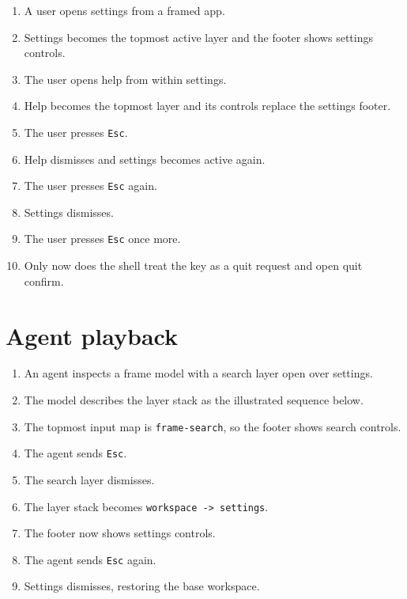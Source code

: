 \begin{enumerate}
\def\labelenumi{\arabic{enumi}.}
\tightlist
\item
  A user opens settings from a framed app.
\item
  Settings becomes the topmost active layer and the footer shows settings controls.
\item
  The user opens help from within settings.
\item
  Help becomes the topmost layer and its controls replace the settings footer.
\item
  The user presses \texttt{E\allowbreak{}s\allowbreak{}c}.
\item
  Help dismisses and settings becomes active again.
\item
  The user presses \texttt{E\allowbreak{}s\allowbreak{}c} again.
\item
  Settings dismisses.
\item
  The user presses \texttt{E\allowbreak{}s\allowbreak{}c} once more.
\item
  Only now does the shell treat the key as a quit request and open quit confirm.
\end{enumerate}

\section{Agent playback}\label{record-255-agent-playback}

\begin{enumerate}
\def\labelenumi{\arabic{enumi}.}
\tightlist
\item
  An agent inspects a frame model with a search layer open over settings.
\item
  The model describes the layer stack as the illustrated sequence below.
\item
  The topmost input map is \texttt{f\allowbreak{}r\allowbreak{}a\allowbreak{}m\allowbreak{}e\allowbreak{}-\allowbreak{}s\allowbreak{}e\allowbreak{}a\allowbreak{}r\allowbreak{}c\allowbreak{}h}, so the footer shows search controls.
\item
  The agent sends \texttt{E\allowbreak{}s\allowbreak{}c}.
\item
  The search layer dismisses.
\item
  The layer stack becomes \texttt{w\allowbreak{}o\allowbreak{}r\allowbreak{}k\allowbreak{}s\allowbreak{}p\allowbreak{}a\allowbreak{}c\allowbreak{}e\allowbreak{} \allowbreak{}-\allowbreak{}>\allowbreak{} \allowbreak{}s\allowbreak{}e\allowbreak{}t\allowbreak{}t\allowbreak{}i\allowbreak{}n\allowbreak{}g\allowbreak{}s}.
\item
  The footer now shows settings controls.
\item
  The agent sends \texttt{E\allowbreak{}s\allowbreak{}c} again.
\item
  Settings dismisses, restoring the base workspace.
\end{enumerate}

